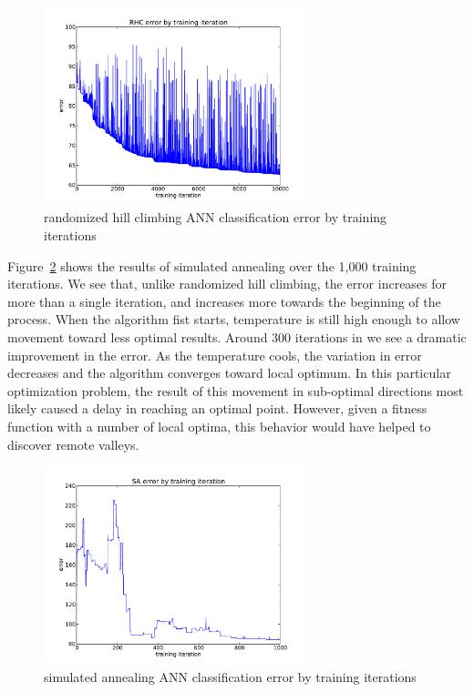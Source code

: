 \documentclass{sig-alternate}
\begin{document}
\begin{figure}[!htbp]
    \centering
    \includegraphics[width=3in]{part1.1/error-rhc-10x.pdf}
    \caption{randomized hill climbing ANN classification error by training iterations \label{error-rhc-10x}}
\end{figure} 

Figure~\ref{error-sa} shows the results of simulated annealing over the 1,000 training iterations. We see that, unlike randomized hill climbing, the error increases for more than a single iteration, and increases more towards the beginning of the process. When the algorithm fist starts, temperature is still high enough to allow movement toward less optimal results. Around 300 iterations in we see a dramatic improvement in the error. As the temperature cools, the variation in error decreases and the algorithm converges toward local optimum. In this particular optimization problem, the result of this movement in sub-optimal directions most likely caused a delay in reaching an optimal point. However, given a fitness function with a number of local optima, this behavior would have helped to discover remote valleys.

\begin{figure}[!htbp]
    \centering
    \includegraphics[width=3in]{part1.1/error-sa.pdf}
    \caption{simulated annealing ANN classification error by training iterations \label{error-sa}}
\end{figure} 
\end{document}
